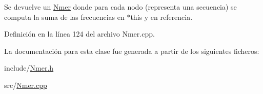 Se devuelve un \hyperlink{classNmer}{Nmer} donde para cada nodo (representa una secuencia) se computa la suma de las frecuencias en $\ast$this y en referencia. 



Definición en la línea 124 del archivo Nmer.\+cpp.



La documentación para esta clase fue generada a partir de los siguientes ficheros\+:\begin{DoxyCompactItemize}
\item 
include/\hyperlink{Nmer_8h}{Nmer.\+h}\item 
src/\hyperlink{Nmer_8cpp}{Nmer.\+cpp}\end{DoxyCompactItemize}
